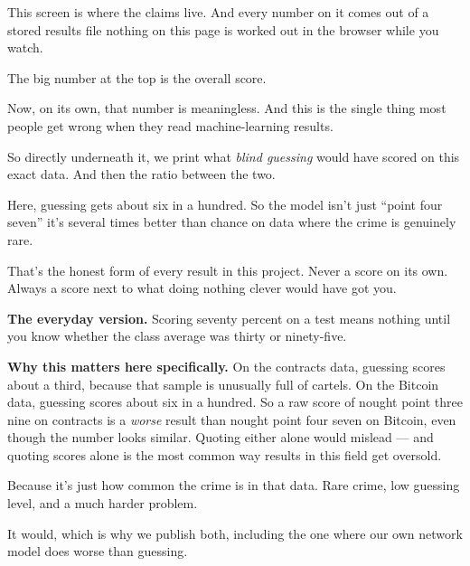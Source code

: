 \documentclass[11pt]{article}
\begin{document}
\begin{saythis}
This screen is where the claims live. And every number on it comes out of a
stored results file \bt nothing on this page is worked out in the browser while
you watch.

The big number at the top is the overall score.

Now, on its own, that number is meaningless. And this is the single thing most
people get wrong when they read machine-learning results.

So directly underneath it, we print what \emph{blind guessing} would have
scored on this exact data. And then the ratio between the two.

Here, guessing gets about six in a hundred. So the model isn't just ``point
four seven'' \bt it's several times better than chance on data where the
crime is genuinely rare.

That's the honest form of every result in this project. Never a score on its
own. Always a score next to what doing nothing clever would have got you.
\end{saythis}

\begin{means}
\textbf{The everyday version.} Scoring seventy percent on a test means nothing
until you know whether the class average was thirty or ninety-five.

\textbf{Why this matters here specifically.} On the contracts data, guessing
scores about a third, because that sample is unusually full of cartels. On the
Bitcoin data, guessing scores about six in a hundred. So a raw score of nought
point three nine on contracts is a \emph{worse} result than nought point four
seven on Bitcoin, even though the number looks similar. Quoting either alone
would mislead --- and quoting scores alone is the most common way results in
this field get oversold.
\end{means}

\begin{asked}
 Because it's just
how common the crime is in that data. Rare crime, low guessing level, and a
much harder problem.

 It would, which is why we
publish both, including the one where our own network model does worse than
guessing.
\end{asked}

\end{document}
